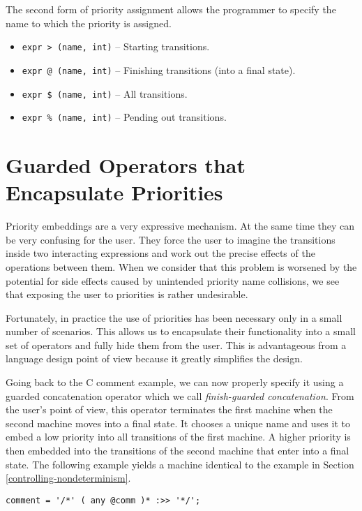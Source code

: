 \documentclass[letterpaper,11pt,oneside]{book}
\newenvironment{inline_code}{\def\baselinestretch{1}\vspace{12pt}\small}{}
\begin{document}
The second form of priority assignment allows the programmer to specify the name
to which the priority is assigned.

\begin{itemize}
\setlength{\parskip}{0in}
\item \verb|expr > (name, int)| -- Starting transitions.
\item \verb|expr @ (name, int)| -- Finishing transitions (into a final state).
\item \verb|expr $ (name, int)| -- All transitions.
\item \verb|expr % (name, int)| -- Pending out transitions.
\end{itemize}

\section{Guarded Operators that Encapsulate Priorities}

Priority embeddings are a very expressive mechanism. At the same time they
can be very confusing for the user. They force the user to imagine
the transitions inside two interacting expressions and work out the precise
effects of the operations between them. When we consider
that this problem is worsened by the
potential for side effects caused by unintended priority name collisions, we
see that exposing the user to priorities is rather undesirable.

Fortunately, in practice the use of priorities has been necessary only in a
small number of scenarios.  This allows us to encapsulate their functionality
into a small set of operators and fully hide them from the user. This is
advantageous from a language design point of view because it greatly simplifies
the design.  

Going back to the C comment example, we can now properly specify
it using a guarded concatenation operator which we call {\em finish-guarded
concatenation}. From the user's point of view, this operator terminates the
first machine when the second machine moves into a final state.  It chooses a
unique name and uses it to embed a low priority into all
transitions of the first machine. A higher priority is then embedded into the
transitions of the second machine that enter into a final state. The following
example yields a machine identical to the example in Section 
\ref{controlling-nondeterminism}.

\begin{inline_code}
\begin{verbatim}
comment = '/*' ( any @comm )* :>> '*/';
\end{verbatim}
\end{inline_code}
\end{document}
